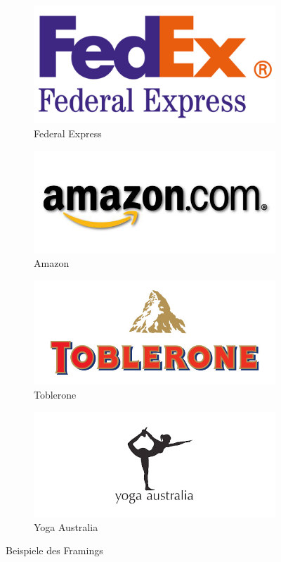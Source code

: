 \begin{figure}[htb]
	\begin{subfigure}[b]{.45\linewidth}
		\centering
		\includegraphics[width=0.8\linewidth]{images/framing-fedex.jpg}
		\caption{Federal Express}
		\label{fig:socialengineering:weiteretechniken:framing:fedex}
	\end{subfigure}%
	\begin{subfigure}[b]{.45\linewidth}
	  \centering
	  \includegraphics[width=0.8\linewidth]{images/framing-amazon.jpg}
	  \caption{Amazon}
	  \label{fig:socialengineering:weiteretechniken:framing:amazon}
	\end{subfigure}
	\begin{subfigure}[b]{.45\linewidth}
		\centering
		\includegraphics[width=0.8\linewidth]{images/framing-toblerone.jpg}
		\caption{Toblerone}
		\label{fig:socialengineering:weiteretechniken:framing:toblerone}
	\end{subfigure}
	\begin{subfigure}[b]{.45\linewidth}
		\centering
		\includegraphics[width=0.8\linewidth]{images/framing-yoga.jpg}
		\caption{Yoga Australia}
		\label{fig:socialengineering:weiteretechniken:framing:yoga}
	\end{subfigure}
  \caption{Beispiele des Framings}
  \label{fig:socialengineering:weiteretechniken:framing}
\end{figure}

